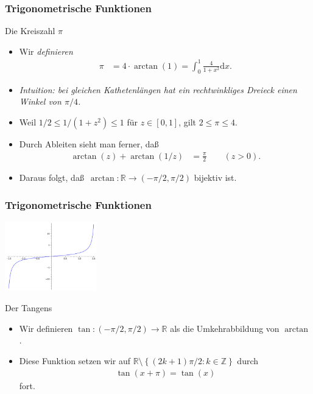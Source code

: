 \documentclass{beamer}
\renewcommand{\emph}[1]{{\textcolor{solarizedRed}{\itshape #1}}}
\newcommand\dd{\mathrm d}
\newcommand\ZZ{\mathbb Z}
\newcommand\RR{\mathbb R}
\newcommand\cbc[1]{\left\{{#1}\right\}}
\renewcommand{\ae}{\"a}
\newcommand{\ue}{\"u}
\newcommand{\mytitle}{Trigonometrische Funktionen}
\begin{document}
\begin{frame}\frametitle{\mytitle}
	\begin{block}{Die Kreiszahl $\pi$}
		\begin{itemize}
			\item Wir \emph{definieren}
				\begin{align*}
					\pi&=4\cdot\arctan(1)=\int_0^1\frac{4}{1+x^2}\dd x.
				\end{align*}
			\item {\itshape Intuition: bei gleichen Kathetenl\ae ngen hat ein rechtwinkliges Dreieck einen Winkel von $\pi/4$.}
			\item Weil $1/2\leq 1/(1+z^2)\leq1$ f\ue r $z\in[0,1]$, gilt $2\leq\pi\leq4$.
			\item Durch Ableiten sieht man ferner, da\ss\
				\begin{align*}
					\arctan(z)+\arctan(1/z)&=\frac{\pi}{2}\qquad(z>0).
				\end{align*}
			\item Daraus folgt, da\ss\ $\arctan:\RR\to(-\pi/2,\pi/2)$ bijektiv ist.
		\end{itemize}
	\end{block}
\end{frame}

\begin{frame}\frametitle{\mytitle}
	\hfill\includegraphics[height=30mm]{pics/plot_tan.pdf}
	\begin{block}{Der Tangens}
		\begin{itemize}
			\item Wir definieren $\tan:(-\pi/2,\pi/2)\to\RR$ als die Umkehrabbildung von $\arctan$.
			\item Diese Funktion setzen wir auf $\RR\setminus\cbc{(2k+1)\pi/2:k\in\ZZ}$ durch
				\begin{align*}
					\tan(x+\pi)=\tan(x)
				\end{align*}
				fort.
		\end{itemize}
	\end{block}
\end{frame}
\end{document}
